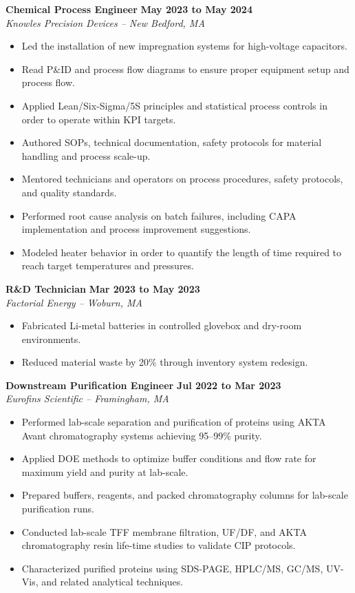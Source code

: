 \documentclass{article}
\begin{document}
\textbf{Chemical Process Engineer} \hfill \textbf{May 2023 to May 2024} \\
\textit{Knowles Precision Devices -- New Bedford, MA}\\[2pt]
\begin{itemize}
  \item Led the installation of new impregnation systems for high-voltage capacitors.
  \item Read P\&ID and process flow diagrams to ensure proper equipment setup and process flow. 
  \item Applied Lean/Six-Sigma/5S principles and statistical process controls in order to operate within KPI targets.
  \item Authored SOPs, technical documentation, safety protocols for material handling and process scale-up.
  \item Mentored technicians and operators on process procedures, safety protocols, and quality standards. 
  \item Performed root cause analysis on batch failures, including CAPA implementation and process improvement suggestions.
  \item Modeled heater behavior in order to quantify the length of time required to reach target temperatures and pressures.
\end{itemize}

\textbf{R\&D Technician} \hfill \textbf{Mar 2023 to May 2023} \\
\textit{Factorial Energy -- Woburn, MA}\\[2pt]
\begin{itemize}
  
  \item Fabricated Li-metal batteries in controlled glovebox and dry-room environments.
  \item Reduced material waste by 20\% through inventory system redesign.
\end{itemize}

\textbf{Downstream Purification Engineer} \hfill \textbf{Jul 2022 to Mar 2023} \\
\textit{Eurofins Scientific -- Framingham, MA}\\[2pt]
\begin{itemize}
  \item Performed lab-scale separation and purification of proteins using AKTA Avant chromatography systems achieving 95--99\% purity.
  \item Applied DOE methods to optimize buffer conditions and flow rate for maximum yield and purity at lab-scale.
  \item Prepared buffers, reagents, and packed chromatography columns for lab-scale purification runs.
  \item Conducted lab-scale TFF membrane filtration, UF/DF, and AKTA chromatography resin life-time studies to validate CIP protocols.
  \item Characterized purified proteins using SDS-PAGE, HPLC/MS, GC/MS, UV-Vis, and related analytical techniques.
\end{itemize}
\end{document}
